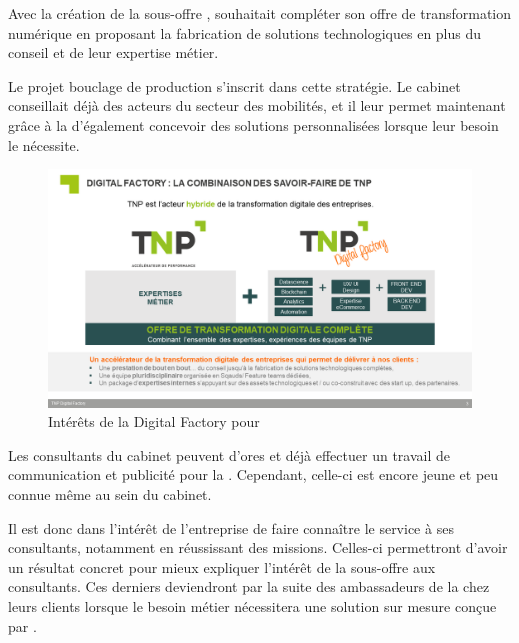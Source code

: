 Avec la création de la sous-offre \df, \tnp souhaitait compléter son offre de transformation numérique en proposant la fabrication de solutions technologiques en plus du conseil et de leur expertise métier.

Le projet bouclage de production s'inscrit dans cette stratégie. Le cabinet conseillait déjà des acteurs du secteur des mobilités, et il leur permet maintenant grâce à la \df d'également concevoir des solutions personnalisées lorsque leur besoin le nécessite.

\begin{figure}[H]
    \centering
    \includegraphics[width=1\linewidth]{img/offre_digital_factory_tnp.png}
    \caption{Intérêts de la Digital Factory pour \tnp}
\end{figure}

Les consultants du cabinet peuvent d'ores et déjà effectuer un travail de communication et publicité pour la \df. Cependant, celle-ci est encore jeune et peu connue même au sein du cabinet.

Il est donc dans l'intérêt de l'entreprise de faire connaître le service à ses consultants, notamment en réussissant des missions. Celles-ci permettront d'avoir un résultat concret pour mieux expliquer l'intérêt de la sous-offre aux consultants. Ces derniers deviendront par la suite des ambassadeurs de la \df chez leurs clients lorsque le besoin métier nécessitera une solution sur mesure conçue par \tnp.
